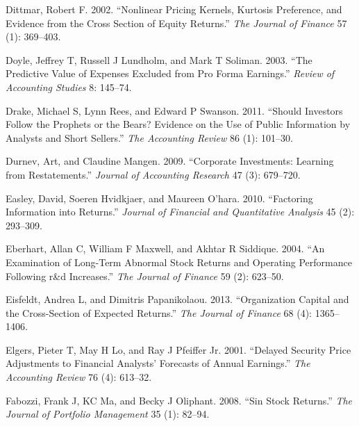 \documentclass[
  letterpaper,
  DIV=11,
  numbers=noendperiod]{scrreprt}
\newlength{\cslhangindent}
\newlength{\cslentryspacingunit} %
\newenvironment{CSLReferences}[2] %
 {%
  \setlength{\parindent}{0pt}
  \ifodd #1
  \let\oldpar\par
  \def\par{\hangindent=\cslhangindent\oldpar}
  \fi
  \setlength{\parskip}{#2\cslentryspacingunit}
 }%
 {}
\begin{document}
\begin{CSLReferences}{1}{0}
\leavevmode{}%
Dittmar, Robert F. 2002. {``Nonlinear Pricing Kernels, Kurtosis
Preference, and Evidence from the Cross Section of Equity Returns.''}
\emph{The Journal of Finance} 57 (1): 369--403.

\leavevmode{}%
Doyle, Jeffrey T, Russell J Lundholm, and Mark T Soliman. 2003. {``The
Predictive Value of Expenses Excluded from Pro Forma Earnings.''}
\emph{Review of Accounting Studies} 8: 145--74.

\leavevmode{}%
Drake, Michael S, Lynn Rees, and Edward P Swanson. 2011. {``Should
Investors Follow the Prophets or the Bears? Evidence on the Use of
Public Information by Analysts and Short Sellers.''} \emph{The
Accounting Review} 86 (1): 101--30.

\leavevmode{}%
Durnev, Art, and Claudine Mangen. 2009. {``Corporate Investments:
Learning from Restatements.''} \emph{Journal of Accounting Research} 47
(3): 679--720.

\leavevmode{}%
Easley, David, Soeren Hvidkjaer, and Maureen O'hara. 2010. {``Factoring
Information into Returns.''} \emph{Journal of Financial and Quantitative
Analysis} 45 (2): 293--309.

\leavevmode{}%
Eberhart, Allan C, William F Maxwell, and Akhtar R Siddique. 2004. {``An
Examination of Long-Term Abnormal Stock Returns and Operating
Performance Following r\&d Increases.''} \emph{The Journal of Finance}
59 (2): 623--50.

\leavevmode{}%
Eisfeldt, Andrea L, and Dimitris Papanikolaou. 2013. {``Organization
Capital and the Cross-Section of Expected Returns.''} \emph{The Journal
of Finance} 68 (4): 1365--1406.

\leavevmode{}%
Elgers, Pieter T, May H Lo, and Ray J Pfeiffer Jr. 2001. {``Delayed
Security Price Adjustments to Financial Analysts' Forecasts of Annual
Earnings.''} \emph{The Accounting Review} 76 (4): 613--32.

\leavevmode{}%
Fabozzi, Frank J, KC Ma, and Becky J Oliphant. 2008. {``Sin Stock
Returns.''} \emph{The Journal of Portfolio Management} 35 (1): 82--94.


\end{CSLReferences}
\end{document}

